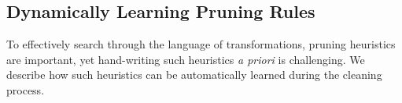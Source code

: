 

% 
% 







\subsection{Dynamically Learning Pruning Rules}\label{s:dynlearn}
To effectively search through the language of transformations, pruning heuristics are important, yet hand-writing such heuristics {\it a priori} is challenging.
We describe how such heuristics can be automatically learned during the cleaning process.

